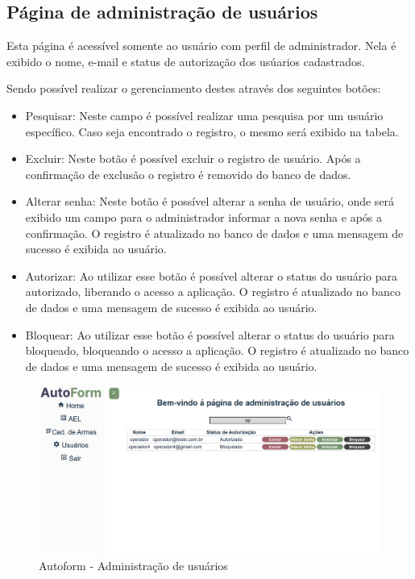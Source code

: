 \subsection{Página de administração de usuários}
Esta página é acessível somente ao usuário com perfil de administrador.
Nela é exibido o nome, e-mail e status de autorização dos usúarios cadastrados.

Sendo possível realizar o gerenciamento destes através dos seguintes botões:
\begin{itemize}
    \item Pesquisar: Neste campo é possível realizar uma pesquisa por um usuário específico. Caso seja encontrado o registro, o mesmo será exibido na tabela.
    \item Excluir: Neste botão é possível excluir o registro de usuário. Após a confirmação de exclusão o registro é removido do banco de dados.
    \item Alterar senha: Neste botão é possível alterar a senha de usuário, onde será exibido um campo para o administrador informar a nova senha e após a confirmação. O registro é atualizado no banco de dados e uma mensagem de sucesso é exibida ao usuário.
    \item Autorizar: Ao utilizar esse botão é possível alterar o status do usuário para autorizado, liberando o acesso a aplicação. O registro é atualizado no banco de dados e uma mensagem de sucesso é exibida ao usuário.
    \item Bloquear: Ao utilizar esse botão é possível alterar o status do usuário para bloqueado, bloqueando o acesso a aplicação. O registro é atualizado no banco de dados e uma mensagem de sucesso é exibida ao usuário.
\end{itemize}

\begin{figure}[H]
    \caption{\label{fig:tela-configuracoes}Autoform - Administração de usuários}
    \begin{center}
        \includegraphics[scale=0.45]{imagens/autoform-configuracoes.png}
    \end{center}
\end{figure}



